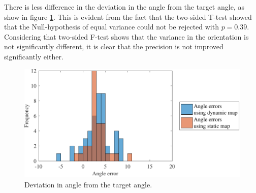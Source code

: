 There is less difference in the deviation in the angle from the target angle, as show in figure \ref{fig:precision_test_angles}. This is evident from the fact that the two-sided T-test showed that the Null-hypothesis of equal variance could not be rejected with $p=0.39$.
Considering that two-sided F-test shows that the variance in the orientation is not significantly different, it is clear that the precision is not improved significantly either.

\begin{figure}
    \centering
    \includegraphics[scale=1]{chapters/evaluation/figures/precision_test_angles}
    \caption{Deviation in angle from the target angle.}
    \label{fig:precision_test_angles}
\end{figure}